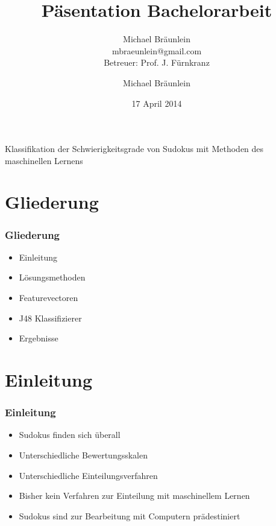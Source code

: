 \documentclass[accentcolor=tud6b,colorbacktitle,inverttitle,landscape,german,presentation,t]{tudbeamer}
\begin{document}
\title[Klassifikation der Schwierigkeitsgrade von Sudokus mit Methoden des maschinellen Lernens]{Päsentation Bachelorarbeit}
\subtitle{Michael Bräunlein\\mbraeunlein@gmail.com\\Betreuer: Prof. J. Fürnkranz}

\author[M. Bräunlein]{Michael Bräunlein}


\date{17 April 2014}

\begin{titleframe}
\centering \LARGE Klassifikation der Schwierigkeitsgrade von Sudokus mit Methoden des maschinellen Lernens
\end{titleframe}

\section{Gliederung}
	\begin{frame}
	\frametitle{Gliederung}
	\begin{itemize}
	\item Einleitung
	\item Lösungsmethoden
	\item Featurevectoren
	\item J48 Klassifizierer
	\item Ergebnisse
	\end{itemize}
	\end{frame}

\section{Einleitung}
	\begin{frame}
	\frametitle{Einleitung}
	\begin{itemize}
	\item Sudokus finden sich überall
	\item Unterschiedliche Bewertungsskalen
	\item Unterschiedliche Einteilungsverfahren
	\item Bisher kein Verfahren zur Einteilung mit maschinellem Lernen
	\item Sudokus sind zur Bearbeitung mit Computern prädestiniert
	\end{itemize}
	\end{frame}
\end{document}
